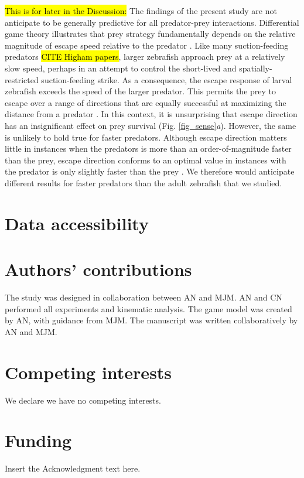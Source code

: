 \documentclass[]{rsos}%
\begin{document}
\hl{This is for later in the Discussion:} The findings of the present study are not anticipate to be generally predictive for all predator-prey interactions. 
Differential game theory illustrates that prey strategy fundamentally depends on the relative magnitude of escape speed relative to the predator \cite{Weihs:1984tb}.
Like many suction-feeding predators \hl{CITE Higham papers}, larger zebrafish approach prey at a relatively slow speed, perhaps in an attempt to control the short-lived and spatially-restricted suction-feeding strike. 
As a consequence, the escape response of larval zebrafish exceeds the speed of the larger predator. 
This permits the prey to escape over a range of directions that are equally successful at maximizing the distance from a predator \cite{Soto:2015cj}.
In this context, it is unsurprising that escape direction has an insignificant effect on prey survival (Fig. \ref{fig_sense}\textit{a}).
However, the same is unlikely to hold true for faster predators.  
Although escape direction matters little in instances when the predators is more than an order-of-magnitude faster than the prey, escape direction conforms to an optimal value in instances with the predator is only slightly faster than the prey \cite{Weihs:1984tb}.
We therefore would anticipate different results for faster predators than the adult zebrafish that we studied.


\section*{Data accessibility}


\section*{Authors' contributions}
The study was designed in collaboration between AN and MJM.
AN and CN performed all experiments and kinematic analysis.
The game model was created by AN, with guidance from MJM. 
The manuscript was written collaboratively by AN and MJM.

\section*{Competing interests}
We declare we have no competing interests.

\section*{Funding}
Insert the Acknowledgment text here.
\end{document}
